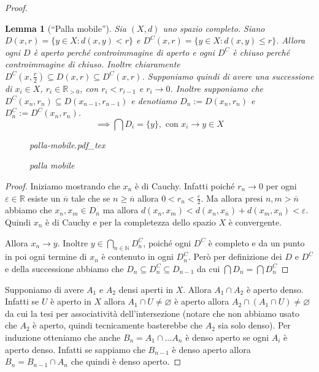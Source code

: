 \documentclass{article}
\newcommand{\incfig}[2][1]{%
    \def\svgwidth{#1\columnwidth}
    {#2.pdf_tex}
}
\newcounter{theo}[section]\setcounter{theo}{0}
\theoremstyle{plain}
\newtheorem{lemma}[theo]{Lemma}
\theoremstyle{definition}
\theoremstyle{remark}
\begin{document}
\begin{proof}
    \begin{lemma}[``Palla mobile'']
    Sia \((X, d)\) uno spazio completo. 
    Siano \(D(x, r) = \{y \in X : d(x, y)< r\} \) e \(D^{C}(x, r) = \{y \in X :
    d(x, y) \le r\} \). Allora ogni \(D\) è aperto perché controimmagine di
    aperto e ogni \(D^{C}\) è chiuso perché controimmagine di chiuso.
    Inoltre chiaramente \(D^{C}(x, \frac{r}{2}) \subseteq D(x, r) \subseteq
    D^{C}(x, r) \). Supponiamo quindi di avere una successione di \(x_{i} \in
    X\), \(r_{i} \in \mathbb{R}_{> 0}\), con \(r_{i} < r_{i - 1}\) e \(r_{i}\to
    0\). Inoltre supponiamo che \(D^{C}(x_{n}, r_{n}) \subseteq D(x_{n-1},
    r_{n-1}) \) e denotiamo \(D_n := D(x_{n}, r_n)\) e \(D^{C}_n := D^{C}(x_n,
    r_n)\).
    \[
        \implies \bigcap D_i = \{y\}, \text{ con } x_i \to y \in X
    \]
\begin{figure}[ht]
    \centering
    \incfig[.4]{palla-mobile}
    \caption{palla mobile}
    \label{fig:palla-mobile}
\end{figure}
\end{lemma}
\begin{proof}
    Iniziamo mostrando che \(x_{n}\) è di Cauchy. Infatti poiché \(r_n \to 0 \)
    per ogni \(\varepsilon \in \mathbb{R}\) esiste un \(\overline{n}\) tale che
    se \(n \ge \overline{n}\) allora \(0 < r_n < \frac{\varepsilon}{2}\). Ma allora presi
    \(n, m > \overline{n}\) abbiamo che \(x_{n}, x_{m} \in D_{\overline{n}}\) ma
    allora \(d(x_{n}, x_{m}) < d(x_{n}, x_{\overline{n}}) + d(x_{m},
    x_{\overline{n}}) < \varepsilon\). Quindi \(x_{n}\) è di Cauchy e per la
    completezza dello spazio \(X\) è convergente.

    Allora \(x_{n} \to y\). Inoltre \(y \in \bigcap_{n \in \mathbb{N}}
    D^{C}_n\), poiché ogni \(D^{C}\) è completo e da un punto in poi ogni
    termine di \(x_{n}\) è contenuto in ogni \(D^{C}_n\).
    Però per definizione dei \(D\) e \(D^{C}\) e della successione abbiamo che
    \(D_n \subseteq D_n^{C} \subseteq D_{n-1}  \) da cui \(\bigcap D_n =
    \bigcap D_n^{C}  \) 
\end{proof}
Supponiamo di avere \(A_{1}\) e \(A_{2}\) densi aperti in \(X\). Allora \(A_{1}
\cap A_{2}\) è aperto denso. Infatti se \(U\) è aperto in \(X\) allora \(A_{1}
\cap U \neq \varnothing\) è aperto allora \(A_{2} \cap (A_{1} \cap U) \neq
\varnothing\) da cui la tesi per associatività dell'intersezione (notare che
non abbiamo usato che \(A_{2}\) è aperto, quindi tecnicamente basterebbe che
\(A_{2}\) sia solo denso). Per induzione otteniamo che anche \(B_n = A_{1} \cap
\dots A_n\) è denso aperto se ogni \(A_{i}\) è aperto denso. Infatti se sappiamo che
\(B_{n-1}\) è denso aperto allora \(B_n = B_{n-1} \cap A_n\) che quindi è denso
aperto.


\end{proof}
\end{document}
